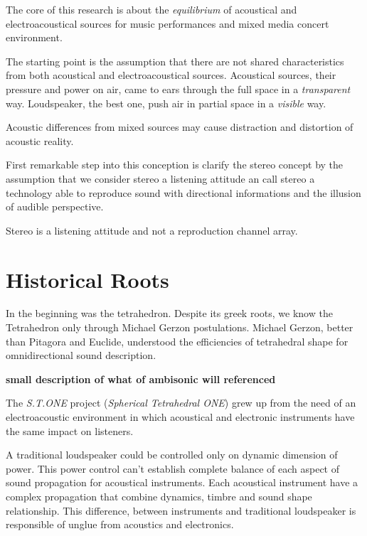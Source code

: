 \documentclass{article}
\begin{document}
The core of this research is about the \emph{equilibrium} of acoustical and electroacoustical
sources for music performances and mixed media concert environment.

The starting point is the assumption that there are not shared characteristics from both
acoustical and electroacoustical sources. Acoustical sources, their pressure and power on air,
came to ears through the full space in a \emph{transparent} way. Loudspeaker, the best one,
push air in partial space in a \emph{visible} way.

Acoustic differences from mixed sources may cause distraction and distortion of acoustic reality.

First remarkable step into this conception is clarify the stereo concept by the assumption that
we consider stereo a listening attitude an call stereo a technology able to reproduce sound with
directional informations and the illusion of audible perspective.

Stereo is a listening attitude and not a reproduction channel array.


\section{Historical Roots}
\label{sec:roots}

In the beginning was the tetrahedron. Despite its greek roots, we know the Tetrahedron
only through Michael Gerzon \cite{mgamb02} postulations. Michael Gerzon, better than
Pitagora and Euclide, understood the efficiencies of tetrahedral shape for omnidirectional
sound description.

\textbf{small description of what of ambisonic will referenced }

The \emph{S.T.ONE} project (\emph{Spherical Tetrahedral ONE}) grew up from the need of an
electroacoustic environment in which acoustical and electronic instruments have the same
impact on listeners.

A traditional loudspeaker could be controlled only on dynamic dimension of power.
This power control can't establish complete balance of each aspect of sound propagation for
acoustical instruments. Each acoustical instrument have a complex propagation that
combine dynamics, timbre and sound shape relationship. This difference, between instruments
and traditional loudspeaker is responsible of unglue from acoustics and electronics.
\end{document}
